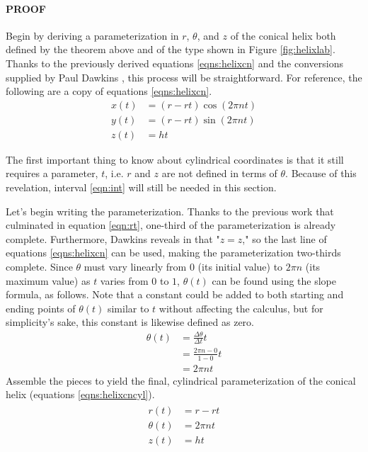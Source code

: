 \documentclass{article}
\begin{document}
\paragraph{PROOF} Begin by deriving a parameterization in $r$, $\theta$, and $z$ of the conical helix both defined by the theorem above and of the type shown in Figure \ref{fig:helixlab}. Thanks to the previously derived equations \ref{eqns:helixcn} and the conversions supplied by Paul Dawkins \cite{Bib:cylcords}, this process will be straightforward. For reference, the following are a copy of equations \ref{eqns:helixcn}.
\begin{align*}
    x(t) &= (r-rt)\cos(2\pi nt)\\
    y(t) &= (r-rt)\sin(2\pi nt)\\
    z(t) &= ht
\end{align*}\par
The first important thing to know about cylindrical coordinates is that it still requires a parameter, $t$, i.e. $r$ and $z$ are not defined in terms of $\theta$. Because of this revelation, interval \ref{eqn:int} will still be needed in this section.\par
Let's begin writing the parameterization. Thanks to the previous work that culminated in equation \ref{eqn:rt}, one-third of the parameterization is already complete. Furthermore, Dawkins reveals in \cite{Bib:cylcords} that "$z=z$," so the last line of equations \ref{eqns:helixcn} can be used, making the parameterization two-thirds complete. Since $\theta$ must vary linearly from $0$ (its initial value) to $2\pi n$ (its maximum value) as $t$ varies from $0$ to $1$, $\theta(t)$ can be found using the slope formula, as follows. Note that a constant could be added to both starting and ending points of $\theta(t)$ similar to $t$ without affecting the calculus, but for simplicity's sake, this constant is likewise defined as zero.
\begin{align*}
    \theta(t) &= \frac{\Delta\theta}{\Delta t}t\\
    &= \frac{2\pi n-0}{1-0}t\\
    &= 2\pi nt
\end{align*}
Assemble the pieces to yield the final, cylindrical parameterization of the conical helix (equations \ref{eqns:helixcncyl}).
\begin{align}\label{eqns:helixcncyl}
    \begin{split}
        r(t) &= r-rt\\
        \theta(t) &= 2\pi nt\\
        z(t) &= ht
    \end{split}
\end{align}\par
\end{document}

